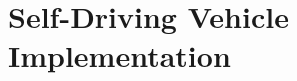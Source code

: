 \documentclass[ %
                    author={Alexander Hill},
                supervisor={Dr. Benjamin Sach},
                    degree={MEng},
                     title={MARMOSET},
                  subtitle={Multi-Agent Route Management using Online Simulation for Efficient Transportation},
                      type={research},
                      year={2016} ]{dissertation}
\begin{document}
\backmatter





\appendix

\chapter{Self-Driving Vehicle Implementation}
\label{appx:example}




\end{document}
